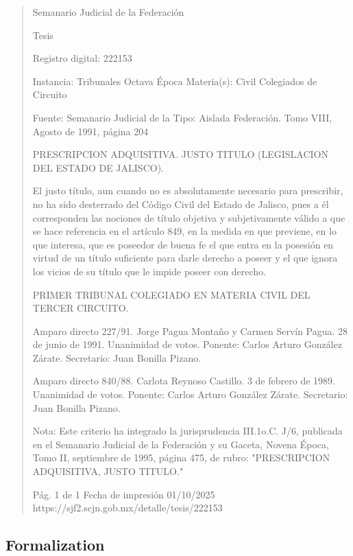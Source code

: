 \documentclass[11pt,a4paper]{article}
\begin{document}
\begin{quote}
                                                   Semanario Judicial de la Federación

                                                  Tesis

 Registro digital: 222153

 Instancia: Tribunales            Octava Época                           Materia(s): Civil
 Colegiados de Circuito

                                  Fuente: Semanario Judicial de la       Tipo: Aislada
                                  Federación.
                                  Tomo VIII, Agosto de 1991, página
                                  204


PRESCRIPCION ADQUISITIVA. JUSTO TITULO (LEGISLACION DEL ESTADO DE JALISCO).


El justo título, aun cuando no es absolutamente necesario para prescribir, no ha sido desterrado del
Código Civil del Estado de Jalisco, pues a él corresponden las nociones de título objetiva y
subjetivamente válido a que se hace referencia en el artículo 849, en la medida en que previene, en
lo que interesa, que es poseedor de buena fe el que entra en la posesión en virtud de un título
suficiente para darle derecho a poseer y el que ignora los vicios de su título que le impide poseer
con derecho.

PRIMER TRIBUNAL COLEGIADO EN MATERIA CIVIL DEL TERCER CIRCUITO.


Amparo directo 227/91. Jorge Pagua Montaño y Carmen Servín Pagua. 28 de junio de 1991.
Unanimidad de votos. Ponente: Carlos Arturo González Zárate. Secretario: Juan Bonilla Pizano.

Amparo directo 840/88. Carlota Reynoso Castillo. 3 de febrero de 1989. Unanimidad de votos.
Ponente: Carlos Arturo González Zárate. Secretario: Juan Bonilla Pizano.

Nota: Este criterio ha integrado la jurisprudencia III.1o.C. J/6, publicada en el Semanario Judicial de
la Federación y su Gaceta, Novena Época, Tomo II, septiembre de 1995, página 475, de rubro:
"PRESCRIPCION ADQUISITIVA, JUSTO TITULO."




                                             Pág. 1 de 1              Fecha de impresión 01/10/2025
  https://sjf2.scjn.gob.mx/detalle/tesis/222153

\end{quote}

\subsection{Formalization}
\end{document}
